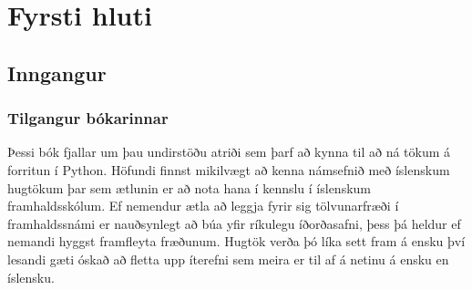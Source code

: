 \documentclass[11pt,fleqn]{book} %
\begin{document}



\pagestyle{empty} %

\tableofcontents %

\cleardoublepage %

\pagestyle{fancy} %


\part{Fyrsti hluti}




\chapter{Inngangur}

\section{Tilgangur bókarinnar}

Þessi bók fjallar um þau undirstöðu atriði sem þarf að kynna til að ná tökum á forritun í Python. 
Höfundi finnst mikilvægt að kenna námsefnið með íslenskum hugtökum þar sem ætlunin er að nota hana í kennslu í íslenskum framhaldsskólum. 
Ef nemendur ætla að leggja fyrir sig tölvunarfræði í framhaldssnámi er nauðsynlegt að búa yfir ríkulegu íðorðasafni, þess þá heldur ef nemandi hyggst framfleyta fræðunum. 
Hugtök verða þó líka sett fram á ensku því lesandi gæti óskað að fletta upp íterefni sem meira er til af á netinu á ensku en íslensku.
\end{document}
